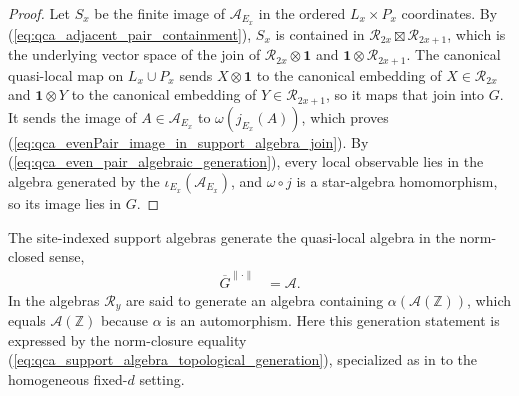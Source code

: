 \begin{proof}\leanok
    Let $S_x$ be the finite image of $\mathcal A_{E_x}$ in the ordered
    $L_x\times P_x$ coordinates.  By
    (\ref{eq:qca_adjacent_pair_containment}), $S_x$ is contained in
    $\mathcal R_{2x}\boxtimes\mathcal R_{2x+1}$, which is the underlying vector
    space of the join of $\mathcal R_{2x}\otimes\mathbf 1$ and
    $\mathbf 1\otimes\mathcal R_{2x+1}$.  The canonical quasi-local map on
    $L_x\cup P_x$ sends $X\otimes\mathbf 1$ to the canonical embedding of
    $X\in\mathcal R_{2x}$ and $\mathbf 1\otimes Y$ to the canonical embedding
    of $Y\in\mathcal R_{2x+1}$, so it maps that join into $G$.  It sends the
    image of $A\in\mathcal A_{E_x}$ to $\omega(j_{E_x}(A))$, which proves
    (\ref{eq:qca_evenPair_image_in_support_algebra_join}).  By
    (\ref{eq:qca_even_pair_algebraic_generation}), every local observable lies
    in the algebra generated by the $\iota_{E_x}(\mathcal A_{E_x})$, and
    $\omega\circ j$ is a star-algebra homomorphism, so its image lies in $G$.
\end{proof}

\begin{lemma}
    \label{thm:qca_support_algebra_topological_generation}
    \leanok
    The site-indexed support algebras generate the quasi-local algebra in the
    norm-closed sense,
    \begin{align}
        \overline{G}^{\lVert\cdot\rVert} & =\mathcal A.
        \label{eq:qca_support_algebra_topological_generation}
    \end{align}
    In \cite[lines~1276--1279]{Gross2012IndexTheory} the algebras
    $\mathcal R_y$ are said to generate an algebra containing
    $\alpha(\mathcal A(\mathbb Z))$, which equals $\mathcal A(\mathbb Z)$
    because $\alpha$ is an automorphism.  Here this generation statement is
    expressed by the norm-closure equality
    (\ref{eq:qca_support_algebra_topological_generation}), specialized as in \cite{gap:gnvw12_site_dependent_adjacent_generation_scope} to the homogeneous
    fixed-$d$
    setting.
\end{lemma}


